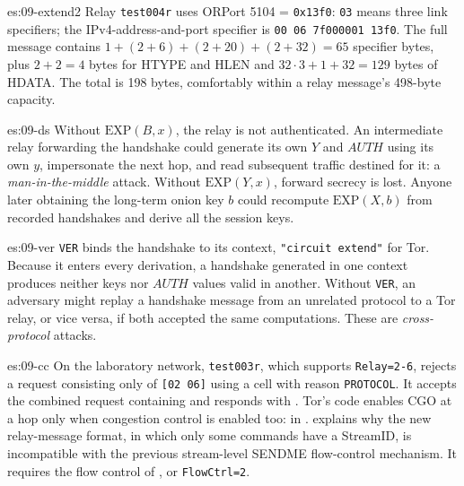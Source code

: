 \begin{soluzione}{es:09-extend2}
Relay \texttt{test004r} uses ORPort 5104 = \texttt{0x13f0}: \texttt{03} means three link specifiers; the IPv4-address-and-port specifier is \texttt{00 06 7f000001 13f0}. The full message contains $1 + (2+6) + (2+20) + (2+32) = 65$ specifier bytes, plus $2 + 2 = 4$ bytes for HTYPE and HLEN and $32 \cdot 3 + 1 + 32 = 129$ bytes of HDATA. The total is 198 bytes, comfortably within a relay message's 498-byte capacity.
\end{soluzione}

\begin{soluzione}{es:09-ds}
Without $\mathrm{EXP}(B, x)$, the relay is not authenticated. An intermediate relay forwarding the handshake could generate its own $Y$ and $\mathit{AUTH}$ using its own $y$, impersonate the next hop, and read subsequent traffic destined for it: a \emph{man-in-the-middle} attack. Without $\mathrm{EXP}(Y, x)$, forward secrecy is lost. Anyone later obtaining the long-term onion key $b$ could recompute $\mathrm{EXP}(X, b)$ from recorded handshakes and derive all the session keys.
\end{soluzione}

\begin{soluzione}{es:09-ver}
\texttt{VER} binds the handshake to its context, \texttt{"circuit extend"} for Tor. Because it enters every derivation, a handshake generated in one context produces neither keys nor $\mathit{AUTH}$ values valid in another. Without \texttt{VER}, an adversary might replay a handshake message from an unrelated protocol to a Tor relay, or vice versa, if both accepted the same computations. These are \emph{cross-protocol} attacks.
\end{soluzione}

\begin{soluzione}{es:09-cc}
On the laboratory network, \texttt{test003r}, which supports \texttt{Relay=2-6}, rejects a request consisting only of \texttt{[02 06]} using a  cell with reason \texttt{PROTOCOL}. It accepts the combined request containing  and responds with . Tor's code enables CGO at a hop only when congestion control is enabled too:  in .  explains why the new relay-message format, in which only some commands have a StreamID, is incompatible with the previous stream-level SENDME flow-control mechanism. It requires the flow control of , or \texttt{FlowCtrl=2}.
\end{soluzione}

